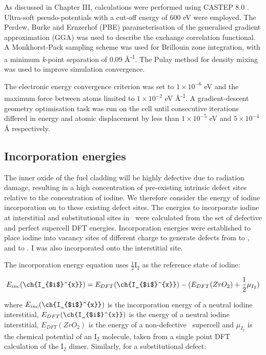 As discussed in Chapter III, calculations were performed using CASTEP 8.0 \cite{Clark2005}. Ultra-soft pseudo-potentials with a cut-off energy of 600 eV were employed. The Perdew, Burke and Ernzerhof (PBE) \cite{Perdew1996} parameterisation of the generalised gradient approximation (GGA) was used to describe the exchange correlation functional. A Monkhorst-Pack sampling scheme \cite{Monkhorst1976} was used for Brillouin zone integration, with a minimum \emph{k}-point separation of 0.09 \r{A}\textsuperscript{-1}. The Pulay method for density mixing \cite{Pulay1980} was used to improve simulation convergence. 

The electronic energy convergence criterion was set to $1\times10^{-6}$ eV and the maximum force between atoms limited to $1\times10^{-2}$ eV \r{A}\textsuperscript{-1}. A gradient-descent geometry optimisation task was run on the cell until consecutive iterations differed in energy and atomic displacement by less than $1\times10^{-5}$ eV and $5\times10^{-4}$ \r{A} respectively. 

\subsection{Incorporation energies}

The inner oxide of the fuel cladding will be highly defective due to radiation damage, resulting in a high concentration of pre-existing intrinsic defect sites relative to the concentration of iodine. We therefore consider the energy of iodine incorporation on to these existing defect sites. The energies to incorporate iodine at interstitial and substitutional sites in \zirconia\ were calculated from the set of defective and perfect supercell DFT energies. Incorporation energies were established to place iodine into vacancy sites of different charge to generate defects from  to , and  to . I was also incorporated onto the interstitial site. 

The incorporation energy equation uses $\frac{1}{2}$I$_{2}$ as the reference state of iodine:

\begin{equation}
\label{interstitial_incorp_equation}
E_{inc}(\ch{I_{$i$}^{x}}) = E_{DFT}(\ch{I_{$i$}^{x}}) - (E_{DFT}(ZrO_2) + \frac{1}{2}\mu_{I_{2}})  %
\end{equation}

where $E_{inc}(\ch{I_{$i$}^{x}})$ is the incorporation energy of a neutral iodine interstitial, $E_{DFT}(\ch{I_{$i$}^{x}})$ is the energy of a neutral iodine interstitial, $E_{DFT}(ZrO_2)$ is the energy of a non-defective \zirconia\ supercell and $\mu_{I_{2}}$ is the chemical potential of an I$_{2}$ molecule, taken from a single point DFT calculation of the I$_{2}$ dimer. Similarly, for a substitutional defect:

